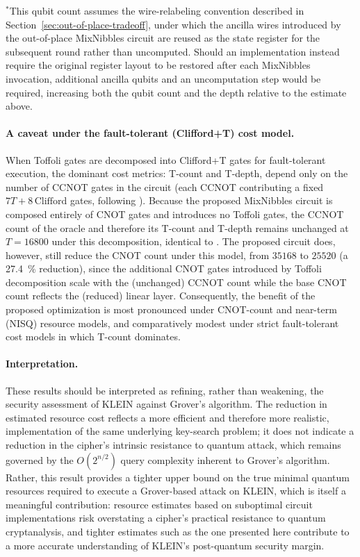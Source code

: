 \noindent $^{*}$This qubit count assumes the wire-relabeling convention
described in Section~\ref{sec:out-of-place-tradeoff}, under which the ancilla
wires introduced by the out-of-place MixNibbles circuit are reused as the state
register for the subsequent round rather than uncomputed. Should an
implementation instead require the original register layout to be restored
after each MixNibbles invocation, additional ancilla qubits and an
uncomputation step would be required, increasing both the qubit count and the
depth relative to the estimate above.

\paragraph{A caveat under the fault-tolerant (Clifford+T) cost model.}
When Toffoli gates are decomposed into Clifford+T gates for fault-tolerant
execution, the dominant cost metrics: T-count and T-depth, depend only on
the number of CCNOT gates in the circuit (each CCNOT contributing a fixed
$7T + 8\,\text{Clifford}$ gates, following \cite{cryptoeprint:2026/1007}). Because
the proposed MixNibbles circuit is composed entirely of CNOT gates and
introduces no Toffoli gates, the CCNOT count of the oracle and therefore
its T-count and T-depth remains unchanged at $T = 16800$ under this
decomposition, identical to \cite{cryptoeprint:2026/1007}. The proposed circuit
does, however, still reduce the CNOT count under this model, from
$35168$ to $25520$ (a \SI{27.4}{\percent} reduction), since the additional
CNOT gates introduced by Toffoli decomposition scale with the (unchanged)
CCNOT count while the base CNOT count reflects the (reduced) linear layer.
Consequently, the benefit of the proposed optimization is most pronounced
under CNOT-count and near-term (NISQ) resource models, and comparatively
modest under strict fault-tolerant cost models in which T-count dominates.

\paragraph{Interpretation.}
These results should be interpreted as refining, rather than weakening, the
security assessment of KLEIN against Grover's algorithm. The reduction in
estimated resource cost reflects a more efficient and therefore more
realistic, implementation of the same underlying key-search problem; it
does not indicate a reduction in the cipher's intrinsic resistance to
quantum attack, which remains governed by the $O(2^{n/2})$ query complexity
inherent to Grover's algorithm. Rather, this result provides a tighter upper
bound on the true minimal quantum resources required to execute a Grover-based
attack on KLEIN, which is itself a meaningful contribution: resource estimates
based on suboptimal circuit implementations risk overstating a cipher's
practical resistance to quantum cryptanalysis, and tighter estimates such as
the one presented here contribute to a more accurate understanding of KLEIN's
post-quantum security margin.

